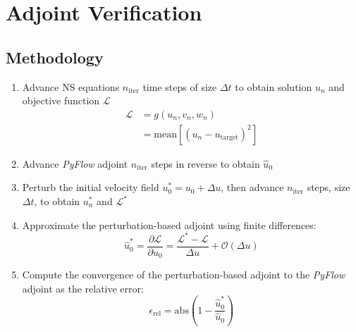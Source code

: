 \documentclass[letterpaper,10pt]{article}
\numberwithin{equation}{section}
\begin{document}
\section{Adjoint Verification}

\subsection{Methodology}
\begin{enumerate}
\item Advance NS equations $n_\mathrm{iter}$ time steps of size $\Delta t$ to obtain solution $u_n$ and objective function $\mathcal{L}$
  \begin{align*}
    \mathcal{L} &= g(u_n,v_n,w_n) \\
    &= \mathrm{mean}\left[\left(u_n - u_\mathrm{target}\right)^2\right]
  \end{align*}
\item Advance \textit{PyFlow} adjoint $n_\mathrm{iter}$ steps in reverse to obtain $\widehat{u}_0$
\item Perturb the initial velocity field $u_0^* = u_0 + \Delta u$, then advance $n_\mathrm{iter}$ steps, size $\Delta t$, to obtain $u^*_n$ and $\mathcal{L}^*$
\item Approximate the perturbation-based adjoint using finite differences:
  \begin{equation*}
    \widehat{u}^*_0 = \frac{\partial \mathcal{L}}{\partial u_0} = \frac{\mathcal{L}^* - \mathcal{L}}{\Delta u} + \mathcal{O}(\Delta u)
  \end{equation*}
\item Compute the convergence of the perturbation-based adjoint to the \textit{PyFlow} adjoint as the relative error:
  \begin{equation*}
    \epsilon_\mathrm{rel} = \mathrm{abs}\left(1-\frac{\widehat{u}^*_0}{\widehat{u}_0}\right)
  \end{equation*}
  
\end{enumerate}
\end{document}
